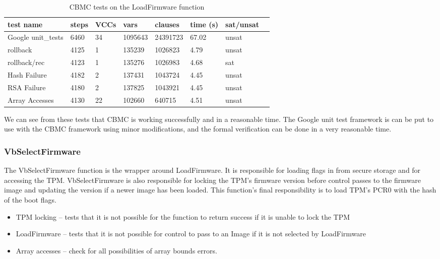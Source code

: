 \documentclass[../report.tex]{subfiles}
\begin{document}
\begin{table}[]
    \centering
    \caption{CBMC tests on the LoadFirmware function}\label{ldfw_results}
    \begin{tabular}{|l|l|l|l|l|l|l|l|}
        \hline
        test name & steps & VCCs & vars  & clauses & time (s) & sat/unsat  \\ \hline \hline
        Google unit\_tests & 6460 & 34 & 1095643 & 24391723 & 67.02 & unsat \\ \hline
        rollback     & 4125 & 1 & 135239 & 1026823 & 4.79 & unsat \\ \hline
        rollback/rec & 4123 & 1 & 135276 & 1026983 & 4.68 & sat \\ \hline
        Hash Failure & 4182 & 2 & 137431 & 1043724 & 4.45 & unsat \\ \hline
        RSA  Failure & 4180 & 2 & 137825 & 1043921 & 4.45 & unsat \\ \hline
        Array Accesses & 4130 & 22 & 102660 & 640715 & 4.51 & unsat \\ \hline
    \end{tabular}
\end{table}

We can see from these tests that CBMC is working successfully and in a reasonable time.
The Google unit test framework is can be put to use with the CBMC framework using minor modifications, and the formal verification can be done in a very reasonable time.

\subsubsection{VbSelectFirmware}

The VbSelectFirmware function is the wrapper around LoadFirmware.
It is responsible for loading flags in from secure storage and for accessing the TPM\@.
VbSelectFirmware is also responsible for locking the TPM's firmware version before control passes to the firmware image and updating the version if a newer image has been loaded.
This function's final responsibility is to load TPM's PCR0 with the hash of the boot flags.

\begin{itemize}
 \item  TPM locking -- tests that it is not possible for the function to return success if it is unable to lock the TPM
 \item  LoadFirmware -- tests that it is not possible for control to pass to an Image if it is not selected by LoadFirmware
 \item  Array accesses -- check for all possibilities of array bounds errors.
\end{itemize}
\end{document}
